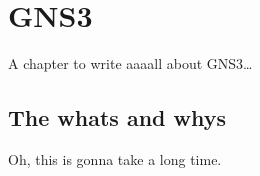 
\chapter{GNS3}

A chapter to write aaaall about GNS3\ldots

\section{The whats and whys}
Oh, this is gonna take a long time.
